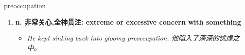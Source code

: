 
\begin{frame}
{\huge preoccupation}
\begin{center}
\begin{enumerate}\Large
  \item \textbf{n. 非常关心,全神贯注: extreme or excessive concern with something}
  \begin{itemize}
    \item \em{\Large{He kept sinking back into gloomy preoccupation. 他陷入了深深的忧虑之中。}}
  \end{itemize}
\end{enumerate}
\end{center}
\end{frame}
